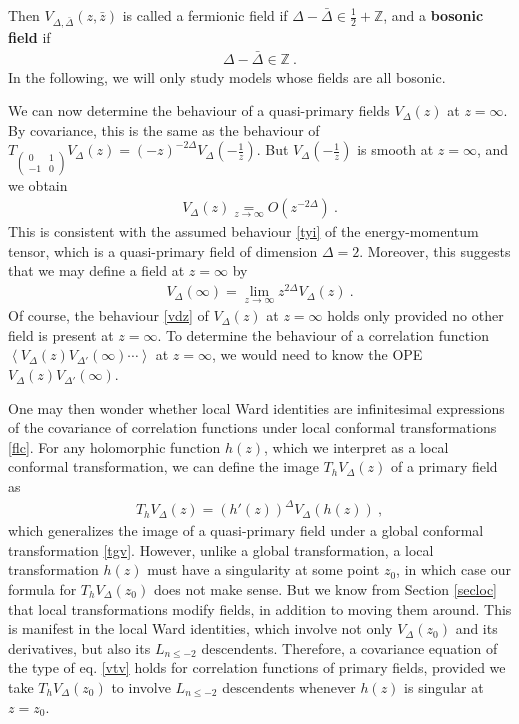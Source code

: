 \documentclass[12pt, a4paper, notitlepage, twoside]{report}
\numberwithin{equation}{section}
\theoremstyle{break}
\begin{document}
Then $V_{\Delta,\bar{\Delta}}(z,\bar{z})$ is called a fermionic field if $\Delta-\bar{\Delta}\in \frac12 +{\mathbb{Z}}$, and a \textbf{bosonic field} if 
\begin{align}
 \Delta-\bar{\Delta} \in {\mathbb{Z}}\ .
\label{dbdz}
\end{align}
In the following, we will only study models whose fields are all bosonic. 

We can now determine the behaviour of a quasi-primary fields $V_\Delta(z)$ at $z=\infty$.
By covariance, this is the same as the behaviour of $T_{\left(\begin{smallmatrix} 0 & 1 \\ -1 & 0 \end{smallmatrix}\right)}V_\Delta(z)= (-z)^{-2\Delta}V_\Delta(-\frac{1}{z})$.
But $V_\Delta(-\frac{1}{z})$ is smooth at $z=\infty$, and we obtain
\begin{align}
 \boxed{V_\Delta(z) \underset{z\to \infty}{=} O\left(z^{-2\Delta}\right)}\ .
\label{vdz}
\end{align}
This is consistent with the assumed behaviour \eqref{tyi} of the energy-momentum tensor, which is a quasi-primary field of dimension $\Delta=2$.
Moreover, this suggests that we may define a field at $z=\infty$ by 
\begin{align}
 V_\Delta(\infty) = \underset{z\to \infty}{\lim} z^{2\Delta} V_\Delta(z)\ . 
\end{align}
Of course, the behaviour \eqref{vdz} of $V_\Delta(z)$ at $z=\infty$ holds only provided no other field is present at $z=\infty$.
To determine the behaviour of a correlation function $\left\langle V_\Delta(z) V_{\Delta'}(\infty)\cdots \right\rangle$ at $z=\infty$, we would need to know the OPE $V_\Delta(z) V_{\Delta'}(\infty)$.

One may then wonder whether local Ward identities are infinitesimal expressions of the covariance of correlation functions under local conformal transformations \eqref{flc}.
For any holomorphic function $h(z)$, which we interpret as a local conformal transformation, we can define the image $T_hV_\Delta(z)$ of a primary field as 
\begin{align}
 \boxed{T_h V_\Delta(z) = (h'(z))^{\Delta} V_\Delta(h(z))}\ ,
\label{thv}
\end{align}
which generalizes the image of a quasi-primary field under a global conformal transformation \eqref{tgv}.
However, unlike a global transformation, a local transformation $h(z)$ must have a singularity at some point $z_0$, in which case our formula for $T_hV_\Delta(z_0)$ does not make sense.
But we know from Section \ref{secloc} that local transformations modify fields, in addition to moving them around.
This is manifest in the local Ward identities, which involve not only $V_\Delta(z_0)$ and its derivatives, but also its $L_{n\leq -2}$ descendents. 
Therefore, a covariance equation of the type of eq. \eqref{vtv} holds for correlation functions of primary fields, provided we take $T_h V_\Delta(z_0)$ to involve $L_{n\leq -2}$ descendents whenever $h(z)$ is singular at $z=z_0$. 
\end{document}
